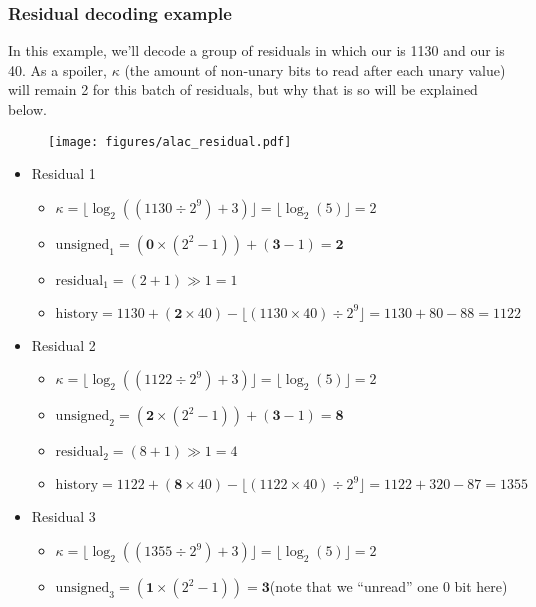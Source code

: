 \clearpage

\subsubsection{Residual decoding example}

In this example, we'll decode a group of residuals in which our
 is 1130 and our  is 40.
As a spoiler, $\kappa$ (the amount of non-unary bits to read
after each unary value) will remain 2 for this batch of residuals,
but why that is so will be explained below.

\begin{figure}[h]
\texttt{[image: figures/alac\_residual.pdf]}
\end{figure}
\begin{itemize}
\setlength{\itemsep}{0in}
\setlength{\parskip}{0in}
\item Residual 1
\begin{itemize}
\item $\kappa = \lfloor\log_2((1130 \div 2^9) + 3)\rfloor = \lfloor\log_2(5)\rfloor = 2$
\item $\text{unsigned}_1 = (\textbf{0} \times (2^2 - 1)) + (\textbf{3} - 1) = \textbf{2}$
\item $\text{residual}_1 = (2 + 1) \gg 1 = 1$
\item $\text{history} = 1130 + (\textbf{2} \times 40) - \lfloor(1130 \times 40) \div 2^9\rfloor = 1130 + 80 - 88 = 1122$
\end{itemize}
\item Residual 2
\begin{itemize}
\item $\kappa = \lfloor\log_2((1122 \div 2^9) + 3)\rfloor = \lfloor\log_2(5)\rfloor = 2$
\item $\text{unsigned}_2 = (\textbf{2} \times (2^2 - 1)) + (\textbf{3} - 1) = \textbf{8}$
\item $\text{residual}_2 = (8 + 1) \gg 1 = 4$
\item $\text{history} = 1122 + (\textbf{8} \times 40) - \lfloor(1122 \times 40) \div 2^9\rfloor = 1122 + 320 - 87 = 1355$
\end{itemize}
\item Residual 3
\begin{itemize}
\item $\kappa = \lfloor\log_2((1355 \div 2^9) + 3)\rfloor = \lfloor\log_2(5)\rfloor = 2$
\item $\text{unsigned}_3 = (\textbf{1} \times (2^2 - 1)) = \textbf{3}$\hfill (note that we ``unread'' one 0 bit here)

\end{itemize}
\end{itemize}
